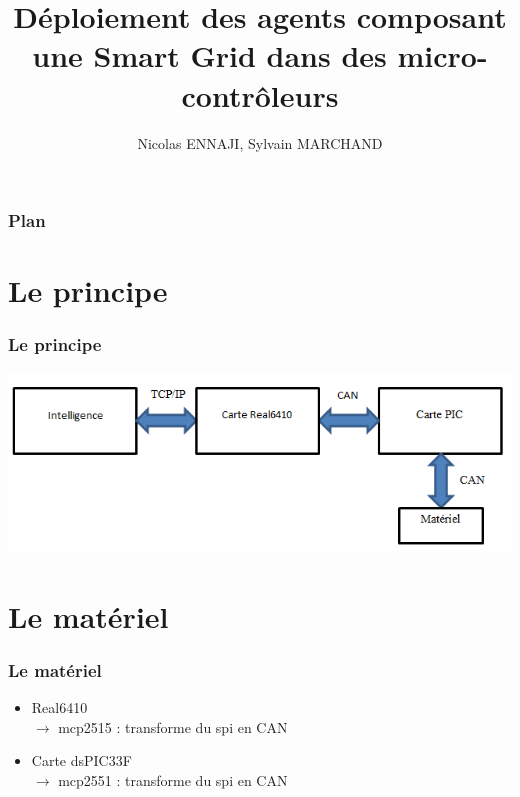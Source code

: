 \documentclass{beamer}
\author{Nicolas ENNAJI, Sylvain MARCHAND}
\title{Déploiement des agents composant une Smart Grid dans des micro-contrôleurs}
\begin{document}
\begin{frame}
\titlepage

\end{frame}


\begin{frame}
\frametitle{Plan}
\tableofcontents

\end{frame}

\section{Le principe}

\begin{frame}
\frametitle{Le principe}

\includegraphics[width=1\textwidth]{images/Recap.png}


\end{frame}

\section{Le matériel}

\begin{frame}
\frametitle{Le matériel}
\begin{itemize}
\item Real6410 \\
  $\rightarrow$ mcp2515 : transforme du spi en CAN
\item Carte dsPIC33F \\
  $\rightarrow$ mcp2551 : transforme du spi en CAN
\end{itemize}

\end{frame}
\end{document}
